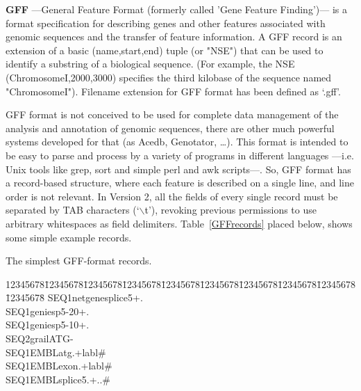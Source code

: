 \label{sec:GFFdefs}
\textbf{GFF} ---General Feature Format (formerly called 'Gene Feature Finding')--- is a format specification for describing genes and other features associated with genomic sequences and the transfer of feature information. A GFF record is an extension of a basic (name,start,end) tuple (or "NSE") that can be used to identify a substring of a biological sequence. (For example, the NSE (ChromosomeI,2000,3000) specifies the third kilobase of the sequence named "ChromosomeI"). Filename extension for GFF format has been defined as `.gff'.\par
GFF format is not conceived to be used for complete data management of the analysis and annotation of genomic sequences, there are other much powerful systems developed for that (as Acedb, Genotator, \ldots). This format is intended to be easy to parse and process by a variety of programs in different languages ---i.e. Unix tools like grep, sort and simple perl and awk scripts---. So, GFF format has a record-based structure, where each feature is described on a single line, and line order is not relevant. In Version 2, all the fields of every single record must be separated by TAB characters (`$\backslash$t'), revoking previous permissions to use arbitrary whitespaces as field delimiters. Table~\ref{GFFrecords} placed below, shows some simple example records.\par

\begin{table}[!ht]
\caption{The simplest GFF-format records.}
\label{GFFrecords}
\begin{center}
\begin{mypsframe}
\begin{minipage}[!ht][][c]{0.8\linewidth}
\scriptsize\ttfamily
\begin{tabbing}
12345678\=12345678\=12345678\=12345678\=12345678\=12345678\=12345678\=12345678\=12345678\=12345678\=\kill
SEQ1\>netgene\>splice5\>+\>.\>\\
SEQ1\>genie\>sp5-20\>+\>.\>\\
SEQ1\>genie\>sp5-10\>+\>.\>\\
SEQ2\>grail\>ATG\>-\>\\
SEQ1\>EMBL\>atg\>.\>+\>labl\>\#\\
SEQ1\>EMBL\>exon\>.\>+\>labl\>\#\\
SEQ1\>EMBL\>splice5\>.\>+\>.\>.\>\#
\end{tabbing}
\end{minipage}
\end{mypsframe}
\end{center}
\end{table}

